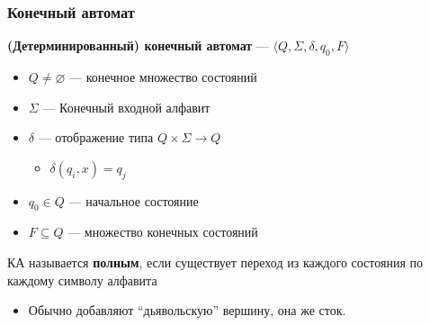 \documentclass{beamer}
\begin{document}
\begin{frame}[fragile]
  \transwipe[direction=90]
  \frametitle{Конечный автомат}
  \textbf{(Детерминированный) конечный автомат} --- $\langle Q, \Sigma, \delta, q_0, F \rangle$
  \begin{itemize}
    \item $Q \neq \varnothing$ --- конечное множество состояний
    \item $\Sigma$ --- Конечный входной алфавит
    \item $\delta$ --- отображение типа $Q \times \Sigma \to Q$
    \begin{itemize}
      \item $\delta(q_i, x) = q_j$
    \end{itemize}
    \item $q_0 \in Q$ --- начальное состояние
    \item $F \subseteq Q$ --- множество конечных состояний
  \end{itemize}

  КА называется \textbf{полным}, если существует переход из каждого состояния по каждому символу алфавита
\begin{itemize}
    \item Обычно добавляют ``дьявольскую'' вершину, она же сток.
\end{itemize}
\end{frame}
\end{document}
